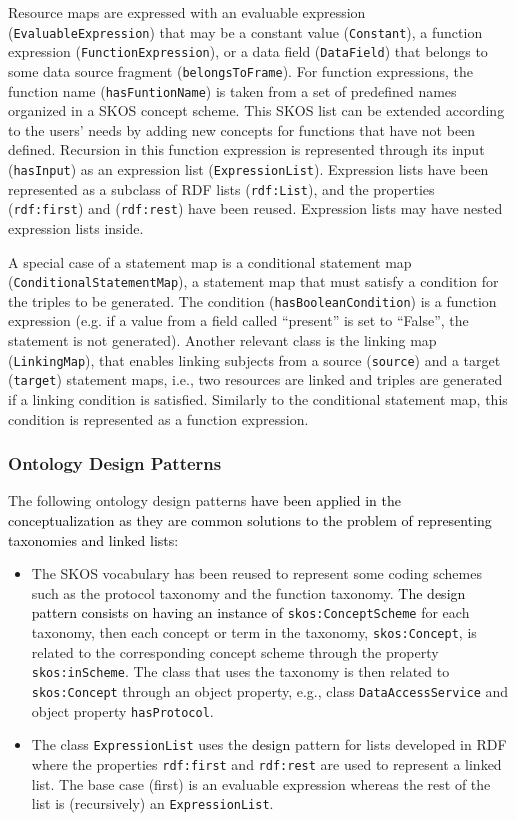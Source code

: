 Resource maps are expressed with an evaluable expression (\texttt{EvaluableExpression}) that may be a constant value (\texttt{Constant}), a function expression (\texttt{FunctionExpression}), or a data field (\texttt{DataField}) that belongs to some data source fragment (\texttt{belongsToFrame}). For function expressions, the function name (\texttt{hasFuntionName}) is taken from a set of predefined names organized in a SKOS concept scheme. This SKOS list can be extended according to the users' needs by adding new concepts for functions that have not been defined. Recursion in this function expression is represented through its input (\texttt{hasInput}) as an expression list (\texttt{ExpressionList}). Expression lists have been represented as a subclass of RDF lists (\texttt{rdf:List}), and the properties (\texttt{rdf:first}) and (\texttt{rdf:rest}) have been reused. Expression lists may have nested expression lists inside.


A special case of a statement map is a conditional statement map (\texttt{ConditionalSta\-tementMap}), a statement map that must satisfy a condition for the triples to be generated. The condition (\texttt{hasBooleanCondition}) is a function expression (e.g. if a value from a field called ``present'' is set to ``False'', the statement is not generated). Another relevant class is the linking map (\texttt{LinkingMap}), that enables linking subjects from a source (\texttt{source}) and a target (\texttt{target}) statement maps, i.e., two resources are linked and triples are generated if a linking condition is satisfied. Similarly to the conditional statement map, this condition is represented as a function expression.

\subsubsection{Ontology Design Patterns}
The following ontology design patterns \textcolor{black}{have been applied in the conceptualization as they are common solutions to the problem of representing taxonomies and linked lists}:
\begin{itemize}
    \item The SKOS vocabulary has been reused to represent some coding schemes such as the protocol taxonomy and the function taxonomy. \textcolor{black}{The design pattern consists on having an instance of} \texttt{skos:ConceptScheme} for each taxonomy, then each concept or term in the taxonomy, \texttt{skos:Concept}, is related to the corresponding concept scheme through the property \texttt{skos:inScheme}. The class that uses the taxonomy is then related to \texttt{skos:Concept} through an object property, e.g., class \texttt{DataAccessSer\-vice} and object property \texttt{hasProtocol}.
    \item The class \texttt{ExpressionList} uses the \textcolor{black}{design} pattern for lists developed in RDF where the properties \texttt{rdf:first} and \texttt{rdf:rest} are used to represent a linked list. The base case (first) is an evaluable expression whereas the rest of the list is (recursively)  an \texttt{ExpressionList}.
\end{itemize}

